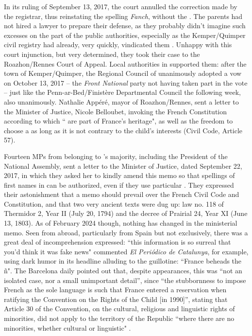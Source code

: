\documentclass[output=paper,colorlinks,citecolor=brown]{langscibook}
\begin{document}
In its ruling of September 13, 2017, the court annulled the correction made by the registrar, thus reinstating the spelling \textit{Fanch}, without the . The parents had not hired a lawyer to prepare their defense, as they probably didn't imagine such excesses on the part of the public authorities, especially as the Kemper/Quimper civil registry had already, very quickly, vindicated them \citep{sm:Blanchet2017}. Unhappy with this court injunction, but very determined, they took their case to the Roazhon/Rennes Court of Appeal. Local authorities in  supported them: after the town of Kemper/Quimper, the Regional Council of  unanimously adopted a vow on October 13, 2017 – the \textit{Front National} party not having taken part in the vote – just like the Penn-ar-Bed/Finistère Departmental Council the following week, also unanimously. Nathalie Appéré, mayor of Roazhon/Rennes, sent a letter to the Minister of Justice, Nicole Belloubet, invoking the French Constitution according to which `` are part of France's heritage", as well as the freedom to choose a  as long as it is not contrary to the child's interests (Civil Code, Article 57).

Fourteen MPs from  belonging to ’s majority, including the President of the National Assembly, sent a letter to the Minister of Justice, dated September 22, 2017, in which they asked her to kindly amend this memo so that spellings of first names in  can be authorized, even if they use particular . They expressed their astonishment that a memo should prevail over the French Civil Code and Constitution, and that two very ancient texts were dug up: law no. 118 of Thermidor 2, Year II (July 20, 1794) and the decree of Prairial 24, Year XI (June 13, 1803). As of February 2024 though, nothing has changed in the ministerial memo. Seen from abroad, particularly from Spain but not exclusively, there was a great deal of incomprehension expressed: ``this information is so surreal that you'd think it was fake news" commented \textit{El Periódico de Catalunya}, for example, using dark humor in its headline alluding to the guillotine: ``France beheads the ñ". The Barcelona daily pointed out that, despite appearances, this was ``not an isolated case, nor a small unimportant detail”, since ``the stubbornness to impose French as the sole language is such that France entered a reservation when ratifying the Convention on the Rights of the Child [in 1990]”, stating that Article 30 of the Convention, on the cultural, religious and linguistic rights of minorities, did not apply to the territory of the Republic ``where there are no minorities, whether cultural or linguistic" \citep{sm:CourrierInternational2018}.
\end{document}
